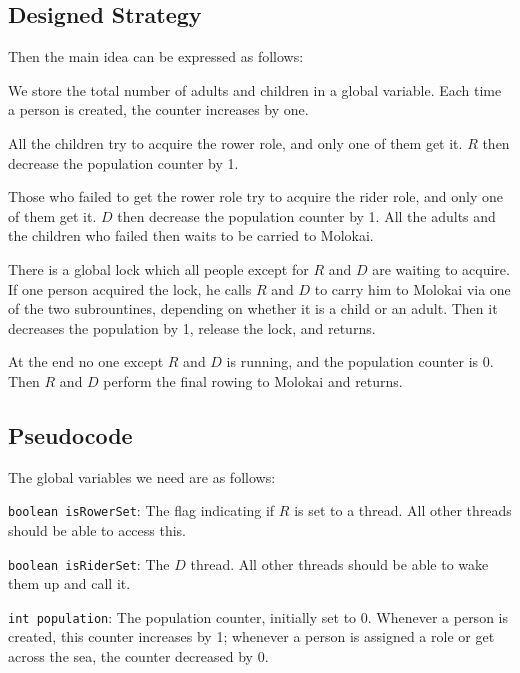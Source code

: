 \documentclass{article}
\begin{document}
\begin{spacing}{1.1}
    \subsection{Designed Strategy}
    Then the main idea can be expressed as follows:
    \begin{asparaitem}
    \item We store the total number of adults and children in a global variable. Each time a person is created, the counter increases by one.\\
    \item All the children try to acquire the rower role, and only one of them get it. $R$ then decrease the population counter by 1.\\
    \item Those who failed to get the rower role try to acquire the rider role, and only one of them get it. $D$ then decrease the population counter by 1. All the adults and the children who failed then waits to be carried to Molokai.\\
    \item There is a global lock which all people except for $R$ and $D$ are waiting to acquire. If one person acquired the lock, he calls $R$ and $D$ to carry him to Molokai via one of the two subrountines, depending on whether it is a child or an adult. Then it decreases the population by 1, release the lock, and returns.\\
    \item At the end no one except $R$ and $D$ is running, and the population counter is 0. Then $R$ and $D$ perform the final rowing to Molokai and returns.
    \end{asparaitem}

    \subsection{Pseudocode}
    The global variables we need are as follows:
    \begin{asparaitem}
    \item \texttt{boolean isRowerSet}: The flag indicating if $R$ is set to a thread. All other threads should be able to access this.\\
    \item \texttt{boolean isRiderSet}: The $D$ thread. All other threads should be able to wake them up and call it.\\
    \item \texttt{int population}: The population counter, initially set to 0. Whenever a person is created, this counter increases by 1; whenever a person is assigned a role or get across the sea, the counter decreased by 0.\\
    \end{asparaitem}


\end{spacing}
\end{document}
